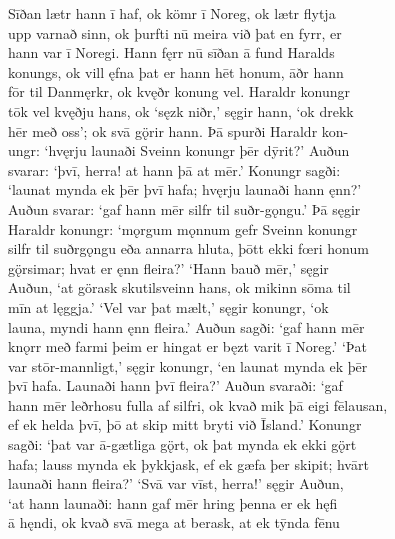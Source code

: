 \documentclass[12pt,letterpaper]{book}
\begin{document}
\begin{linenumbers}
Sīðan lætr hann ī haf, ok kömr ī Noreg, ok lætr flytja\\
upp varnað sinn, ok þurfti nū meira við þat en fyrr, er\\
hann var ī Noregi.  Hann fęrr nū sīðan ā fund Haralds\\
konungs, ok vill ęfna þat er hann hēt honum, āðr hann\\
fōr til Danmęrkr, ok kvęðr konung vel.  Haraldr konungr\\
tōk vel kvęðju hans, ok `sęzk niðr,' sęgir hann, `ok drekk\\
hēr með oss'; ok svā gǫ̈rir hann.  Þā spurði Haraldr kon-\\
ungr: `hvęrju launaði Sveinn konungr þēr dȳrit?'  Auðun\\
svarar: `þvī, herra! at hann þā at mēr.'  Konungr sagði:\\
`launat mynda ek þēr þvī hafa; hvęrju launaði hann ęnn?'\\
Auðun svarar: `gaf hann mēr silfr til suðr-gǫngu.'  Þā sęgir\\
Haraldr konungr: `mǫrgum mǫnnum gefr Sveinn konungr\\
silfr til suðrgǫngu eða annarra hluta, þōtt ekki fœri honum\\
gǫ̈rsimar; hvat er ęnn fleira?'  `Hann bauð mēr,' sęgir\\
Auðun, `at görask skutilsveinn hans, ok mikinn sōma til\\
mīn at lęggja.'  `Vel var þat mælt,' sęgir konungr, `ok\\
launa, myndi hann ęnn fleira.'  Auðun sagði: `gaf hann mēr\\
knǫrr með farmi þeim er hingat er bęzt varit ī Noreg.'  `Þat\\
var stōr-mannligt,' sęgir konungr, `en launat mynda ek þēr\\
þvī hafa.  Launaði hann þvī fleira?'  Auðun svaraði: `gaf\\
hann mēr leðrhosu fulla af silfri, ok kvað mik þā eigi fēlausan,\\
ef ek helda þvī, þō at skip mitt bryti við Īsland.'  Konungr\\
sagði: `þat var ā-gætliga gǫ̈rt, ok þat mynda ek ekki gǫ̈rt\\
hafa; lauss mynda ek þykkjask, ef ek gæfa þer skipit; hvārt\\
launaði hann fleira?'  `Svā var vīst, herra!' sęgir Auðun,\\
`at hann launaði: hann gaf mēr hring þenna er ek hęfi\\
ā hęndi, ok kvað svā mega at berask, at ek tȳnda fēnu\\

\end{linenumbers}
\end{document}
